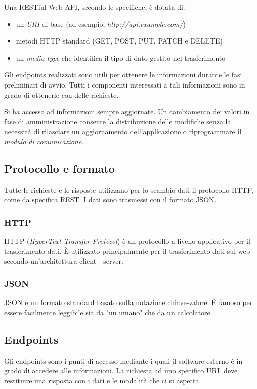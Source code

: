 Una RESTful Web API, secondo le specifiche, è dotata di:
\begin{itemize}
    \item un \textit{URI} di base (ad esempio, \textit{http://api.example.com/})
    \item metodi HTTP standard (GET, POST, PUT, PATCH e DELETE)
    \item un \textit{media type} che identifica il tipo di dato gestito nel trasferimento 
\end{itemize}

\noindent Gli endpoints realizzati sono utili per ottenere le informazioni durante le fasi preliminari di avvio.
Tutti i componenti interessati a tali informazioni sono in grado di ottenerle con delle richieste.

Si ha accesso ad informazioni sempre aggiornate. Un cambiamento dei valori in fase di amministrazione consente la 
distribuzione delle modifiche senza la necessità di rilasciare un aggiornamento dell'applicazione o riprogrammare il 
\textit{modulo di comunicazione}.


\subsection{Protocollo e formato}
Tutte le richieste e le risposte utilizzano per lo scambio dati il protocollo HTTP, come da specifica REST.
I dati sono trasmessi con il formato JSON.

\subsubsection{HTTP}
HTTP (\textit{HyperText Transfer Protocol}) è un protocollo a livello applicativo per il trasferimento dati. È utilizzato principalmente 
per il trasferimento dati sul web secondo un'architettura client - server.

\subsubsection{JSON}
JSON \cite{json} è un formato standard basato sulla notazione chiave-valore. È famoso per essere facilmente 
leggibile sia da "un umano" che da un calcolatore.



\subsection{Endpoints}
Gli endpoints sono i punti di accesso mediante i quali il software esterno 
è in grado di accedere alle informazioni. La richiesta ad uno specifico URL 
deve restituire una risposta con i dati e le modalità che ci si aspetta.

